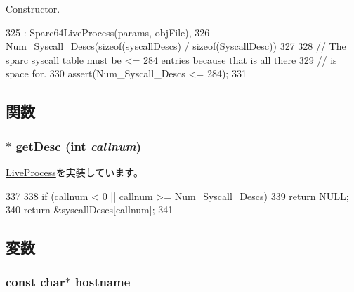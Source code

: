 Constructor. 


\begin{DoxyCode}
325     : Sparc64LiveProcess(params, objFile),
326      Num_Syscall_Descs(sizeof(syscallDescs) / sizeof(SyscallDesc))
327 {
328     // The sparc syscall table must be <= 284 entries because that is all there
329     // is space for.
330     assert(Num_Syscall_Descs <= 284);
331 }
\end{DoxyCode}


\subsection{関数}
\hypertarget{classSparcISA_1_1SparcSolarisProcess_aebbff609a7235342925445690acf5ee8}{
\subsubsection[{getDesc}]{ $\ast$ getDesc (int {\em callnum})}}
\label{classSparcISA_1_1SparcSolarisProcess_aebbff609a7235342925445690acf5ee8}


\hyperlink{classLiveProcess_a478f396f8895ef7728d26866a00121d7}{LiveProcess}を実装しています。


\begin{DoxyCode}
337 {
338     if (callnum < 0 || callnum >= Num_Syscall_Descs)
339         return NULL;
340     return &syscallDescs[callnum];
341 }
\end{DoxyCode}


\subsection{変数}
\hypertarget{classSparcISA_1_1SparcSolarisProcess_aad01339e89106fdf68f57ef118956fa9}{
\subsubsection[{hostname}]{\setlength{\rightskip}{0pt plus 5cm}const char$\ast$ {\bf hostname}}}
\label{classSparcISA_1_1SparcSolarisProcess_aad01339e89106fdf68f57ef118956fa9}


